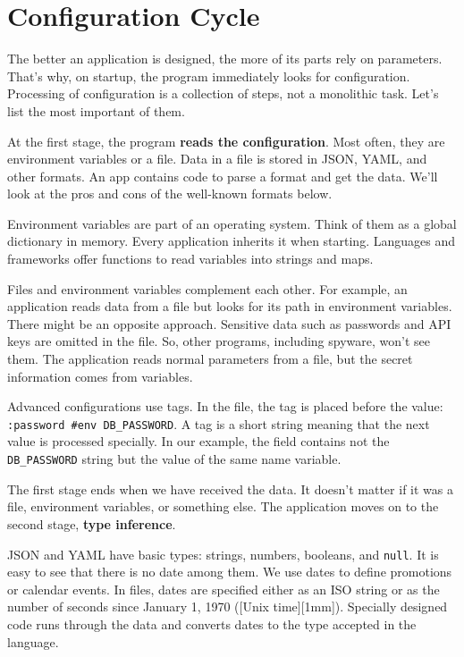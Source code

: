 \label{feature-flags}

\section{Configuration Cycle}

The better an application is designed, the more of its parts rely on parameters. That's why, on startup, the program immediately looks for configuration. Processing of configuration is a collection of steps, not a monolithic task. Let's list the most important of them.

At the first stage, the program \textbf{reads the configuration}. Most often, they are environment variables or a file. Data in a file is stored in JSON, YAML, and other formats. An app contains code to parse a format and get the data. We'll look at the pros and cons of the well-known formats below.

Environment variables are part of an operating system. Think of them as a global dictionary in memory. Every application inherits it when starting. Languages and frameworks offer functions to read variables into strings and maps.

Files and environment variables complement each other. For example, an application reads data from a file but looks for its path in environment variables. There might be an opposite approach. Sensitive data such as passwords and API keys are omitted in the file. So, other programs, including spyware, won't see them. The application reads normal parameters from a file, but the secret information comes from variables.


Advanced configurations use tags. In the file, the tag is placed before the value: \verb|:password #env DB_PASSWORD|. A tag is a short string meaning that the next value is processed specially. In our example, the  field contains not the \verb|DB_PASSWORD| string but the value of the same name variable.

The first stage ends when we have received the data. It doesn't matter if it was a file, environment variables, or something else. The application moves on to the second stage, \textbf{type inference}.


JSON and YAML have basic types: strings, numbers, booleans, and \verb|null|. It is easy to see that there is no date among them. We use dates to define promotions or calendar events. In files, dates are specified either as an ISO string or as the number of seconds since January 1, 1970 ([Unix time][1mm]). Specially designed code runs through the data and converts dates to the type accepted in the language.

